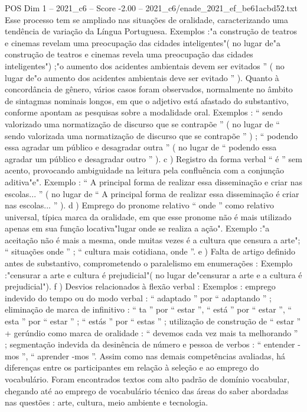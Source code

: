 \begin{textsample}{POS Dim 1 – 2021\_c6 – Score -2.00 – 2021\_c6/enade\_2021\_ef\_be61acbd52.txt}
Esse processo tem se ampliado nas situações de oralidade, caracterizando uma tendência de variação da Língua Portuguesa.
Exemplos :"a construção de teatros e cinemas revelam uma preocupação das cidades inteligentes"( no lugar de"a construção de teatros e cinemas revela uma preocupação das cidades inteligentes") ;"o aumento dos acidentes ambientais devem ser evitados ” ( no lugar de"o aumento dos acidentes ambientais deve ser evitado ” ).
Quanto à concordância de gênero, vários casos foram observados, normalmente no âmbito de sintagmas nominais longos, em que o adjetivo está afastado do substantivo, conforme apontam as pesquisas sobre a modalidade oral.
Exemplos : “ sendo valorizado uma normatização de discurso que se contrapõe ” ( no lugar de “ sendo valorizada uma normatização de discurso que se contrapõe ” ) ; “ podendo essa agradar um público e desagradar outra ” ( no lugar de “ podendo essa agradar um público e desagradar outro ” ). c ) Registro da forma verbal “ é ” sem acento, provocando ambiguidade na leitura pela confluência com a conjunção aditiva"e".
Exemplo : “ A principal forma de realizar essa disseminação e criar nas escolas... ” ( no lugar de “ A principal forma de realizar essa disseminação é criar nas escolas... ” ). d ) Emprego do pronome relativo “ onde ” como relativo universal, típica marca da oralidade, em que esse pronome não é mais utilizado apenas em sua função locativa"lugar onde se realiza a ação".
Exemplo :"a aceitação não é mais a mesma, onde muitas vezes é a cultura que censura a arte"; “ situações onde ” ; “ cultura mais cotidiana, onde ”. e ) Falta de artigo definido antes de substantivo, comprometendo o paralelismo em enumerações : Exemplo :"censurar a arte e cultura é prejudicial"( no lugar de"censurar a arte e a cultura é prejudicial"). f ) Desvios relacionados à flexão verbal : Exemplos : emprego indevido do tempo ou do modo verbal : “ adaptado ” por “ adaptando ” ; eliminação de marca de infinitivo : “ ta ” por “ estar ”, “ está ” por “ estar ”, “ esta ” por “ estar ” ; “ estás ” por “ estas ” ; utilização de construção de “ estar ” + gerúndio como marca de oralidade : “ devemos cada vez mais ta melhorando ” ; segmentação indevida da desinência de número e pessoa de verbos : “ entender -mos ”, “ aprender -mos ”.
Assim como nas demais competências avaliadas, há diferenças entre os participantes em relação à seleção e ao emprego do vocabulário.
Foram encontrados textos com alto padrão de domínio vocabular, chegando até ao emprego de vocabulário técnico das áreas do saber abordadas nas questões : arte, cultura, meio ambiente e tecnologia.

\end{textsample}
